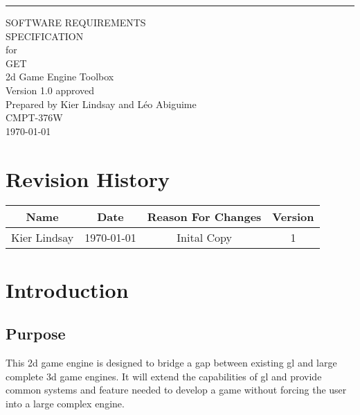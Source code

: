 \documentclass{scrreprt}
\date{}
\def\myversion{1.0 }
\begin{document}
\begin{flushright}
    \rule{16cm}{5pt}\vskip1cm
    \begin{bfseries}
        \Huge{SOFTWARE REQUIREMENTS\\ SPECIFICATION}\\
        \vspace{1.9cm}
        for\\
        \vspace{1.9cm}
        GET\\
        2d Game Engine Toolbox\\
        \vspace{1.9cm}
        \LARGE{Version \myversion approved}\\
        \vspace{1.9cm}
        Prepared by Kier Lindsay and Léo Abiguime\\
        \vspace{1.9cm}
        CMPT-376W\\
        \vspace{1.9cm}
        \today\\
    \end{bfseries}
\end{flushright}

\tableofcontents


\chapter*{Revision History}

\begin{center}
    \begin{tabular}{|c|c|c|c|}
        \hline
	    Name & Date & Reason For Changes & Version\\
        \hline
	    Kier Lindsay & \today & Inital Copy & 1\\
        \hline
    \end{tabular}
\end{center}

\chapter{Introduction}

\section{Purpose}
This 2d game engine is designed to bridge a gap between existing \gls{gl} and large complete 3d game engines.  It will extend the capabilities of \gls{gl} and provide common systems and feature needed to develop a game without forcing the user into a large complex engine.
\end{document}

